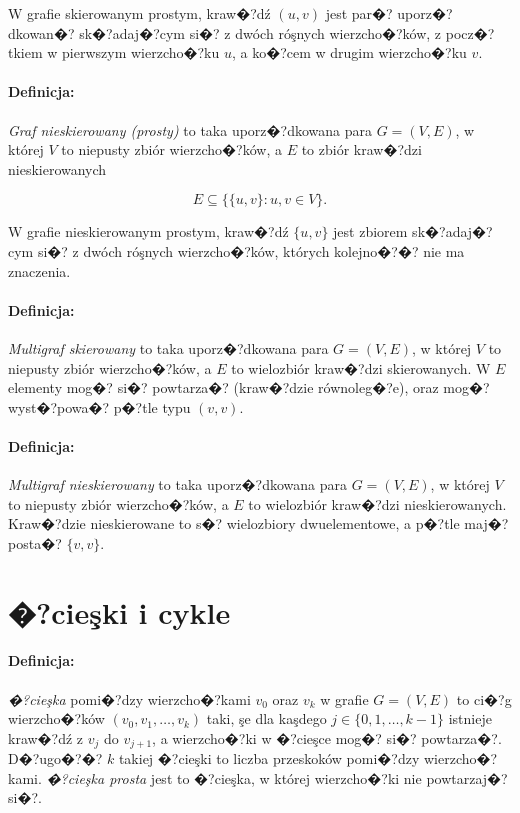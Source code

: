 \documentclass[12pt,a4paper]{mwrep}
\begin{document}
W grafie skierowanym prostym, kraw�?dź $(u,v)$ jest par�? uporz�?dkowan�?
sk�?adaj�?cym si�? z dwóch róşnych wierzcho�?ków, 
z pocz�?tkiem w pierwszym wierzcho�?ku $u$, 
a ko�?cem w drugim wierzcho�?ku $v$.

\paragraph{Definicja:} \emph{Graf nieskierowany (prosty)} to taka uporz�?dkowana
para $G=(V,E)$, w której $V$ to niepusty zbiór wierzcho�?ków, a $E$ to zbiór
kraw�?dzi nieskierowanych

\begin{equation}
E \subseteq \{ \{ u,v \} : u,v \in V \}.
\end{equation}

W grafie nieskierowanym prostym, kraw�?dź $\{ u, v \}$ jest zbiorem 
sk�?adaj�?cym si�? z dwóch róşnych wierzcho�?ków, 
których kolejno�?�? nie ma znaczenia.

\paragraph{Definicja:} \emph{Multigraf skierowany} to taka uporz�?dkowana
para $G=(V,E)$, w której $V$ to niepusty zbiór wierzcho�?ków, 
a $E$ to wielozbiór kraw�?dzi skierowanych.
W $E$ elementy mog�? si�? powtarza�? (kraw�?dzie równoleg�?e),
oraz mog�? wyst�?powa�? p�?tle typu $(v,v)$.

\paragraph{Definicja:} \emph{Multigraf nieskierowany} to taka uporz�?dkowana
para $G=(V,E)$, w której $V$ to niepusty zbiór wierzcho�?ków, 
a $E$ to wielozbiór kraw�?dzi nieskierowanych.
Kraw�?dzie nieskierowane to s�? wielozbiory dwuelementowe,
a p�?tle maj�? posta�? $\{ v,v \}$.

\section{�?cieşki i cykle}

\paragraph{Definicja:} \emph{�?cieşka} pomi�?dzy wierzcho�?kami $v_0$ oraz $v_k$
w grafie  $G=(V,E)$ to ci�?g wierzcho�?ków $(v_0, v_1, \dots , v_k)$ taki, 
şe dla kaşdego $j \in \{0,1,\dots ,k-1 \}$ 
istnieje kraw�?dź z $v_j$ do $v_{j+1}$, 
a wierzcho�?ki w �?cieşce mog�? si�? powtarza�?. 
D�?ugo�?�? $k$ takiej �?cieşki to liczba przeskoków pomi�?dzy wierzcho�?kami.
\emph{�?cieşka prosta} jest to �?cieşka, w której wierzcho�?ki nie powtarzaj�? si�?.
\end{document}
